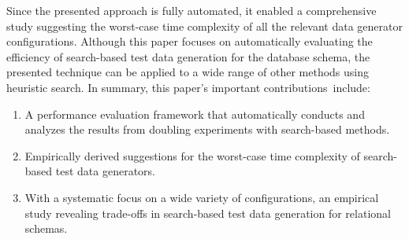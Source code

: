 Since the presented approach is fully automated, it enabled a comprehensive study suggesting the worst-case time
complexity of all the relevant data generator configurations. Although this paper focuses on automatically evaluating
the efficiency of search-based test data generation for the database
schema, the presented technique can be applied to a wide range of other methods using heuristic search. In summary, this paper's important \mbox{contributions
include}:



\vspace*{-.05in}
\begin{enumerate}
  \itemsep0in

  \item A performance evaluation framework that automatically conducts and analyzes the results from doubling
    experiments with search-based methods.

  \item Empirically derived suggestions for the worst-case time complexity of search-based test data generators.

  \item With a systematic focus on a wide variety of configurations, an empirical study revealing trade-offs
    in search-based test data generation for relational schemas.

  \end{enumerate}
  \vspace*{-.15in}
